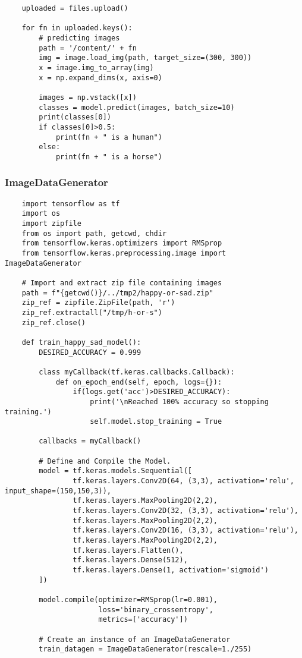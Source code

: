 \documentclass[11pt, a4paper]{article}
\begin{document}
\begin{spacing}{1.1}
\begin{lstlisting}
	uploaded = files.upload()
	
	for fn in uploaded.keys():
		# predicting images
		path = '/content/' + fn
		img = image.load_img(path, target_size=(300, 300))
		x = image.img_to_array(img)
		x = np.expand_dims(x, axis=0)
		
		images = np.vstack([x])
		classes = model.predict(images, batch_size=10)
		print(classes[0])
		if classes[0]>0.5:
			print(fn + " is a human")
		else:
			print(fn + " is a horse") \end{lstlisting} \newpage

	\subsubsection{ImageDataGenerator}
	\begin{lstlisting}
	import tensorflow as tf
	import os
	import zipfile
	from os import path, getcwd, chdir
	from tensorflow.keras.optimizers import RMSprop
    from tensorflow.keras.preprocessing.image import ImageDataGenerator	
	
	# Import and extract zip file containing images
	path = f"{getcwd()}/../tmp2/happy-or-sad.zip"
	zip_ref = zipfile.ZipFile(path, 'r')
	zip_ref.extractall("/tmp/h-or-s")
	zip_ref.close()
	
	def train_happy_sad_model():		
		DESIRED_ACCURACY = 0.999
		
		class myCallback(tf.keras.callbacks.Callback):
			def on_epoch_end(self, epoch, logs={}):
				if(logs.get('acc')>DESIRED_ACCURACY):
					print('\nReached 100% accuracy so stopping training.')
					self.model.stop_training = True
		
		callbacks = myCallback()
		
		# Define and Compile the Model.
		model = tf.keras.models.Sequential([
				tf.keras.layers.Conv2D(64, (3,3), activation='relu', input_shape=(150,150,3)),
				tf.keras.layers.MaxPooling2D(2,2),
				tf.keras.layers.Conv2D(32, (3,3), activation='relu'),
				tf.keras.layers.MaxPooling2D(2,2),
				tf.keras.layers.Conv2D(16, (3,3), activation='relu'),
				tf.keras.layers.MaxPooling2D(2,2),
				tf.keras.layers.Flatten(),
				tf.keras.layers.Dense(512),
				tf.keras.layers.Dense(1, activation='sigmoid')
		])
		
		model.compile(optimizer=RMSprop(lr=0.001),
		              loss='binary_crossentropy',
		              metrics=['accuracy'])
		
		# Create an instance of an ImageDataGenerator 		
		train_datagen = ImageDataGenerator(rescale=1./255)
		

\end{lstlisting}
\end{spacing}
\end{document}
